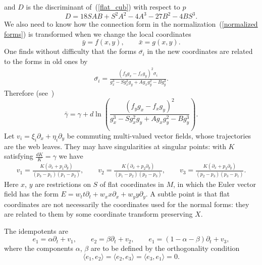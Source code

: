 \documentclass[pdftex]{sigma}
\begin{document}
and $D$ is the discriminant of~(\ref{flat_cub}) with respect to $p$
\[
D=18SAB+S^2A^2-4A^3-27B^2-4BS^3.
\]
We also need to know how the connection form in the normalization~(\ref{normalized forms})
is transformed when we change the local coordinates
\[
\bar{y}=f(x,y), \qquad \bar{x}=g(x,y).
\]
One f\/inds without dif\/f\/iculty that the forms $\bar{\sigma_i}$
in the new coordinates are related to the forms in old ones by
\begin{gather*}%
\bar{\sigma_i}=\frac{(f_yg_x-f_xg_y)^2\sigma_i}{g_x^3-Sg_x^2g_y+Ag_xg_y^2-Bg_y^3}.
\end{gather*}
Therefore (see~\cite{Be})
\begin{equation}\label{connection transforms}
\bar{\gamma}=\gamma+d\ln\left(\frac{(f_yg_x-f_xg_y)^2}{g_x^3-Sg_x^2g_y+Ag_xg_y^2-Bg_y^3}\right).
\end{equation}
Let $v_i=\xi_i \partial_x+\eta_i\partial_y$ be commuting multi-valued vector f\/ields,
whose trajectories are the web leaves. They may have singularities at singular points:
with $K$ satisfying $\frac{dK}{K}=\gamma $ we have
\begin{gather*}%
v_1=\frac{K(\partial_x +p_1 \partial_y)}{(p_3-p_1)(p_1-p_2)},\qquad
v_2=\frac{K(\partial_x +p_2 \partial_y)}{(p_1-p_2)(p_2-p_3)},\qquad
v_3=\frac{K(\partial_x +p_3 \partial_y)}{(p_2-p_3)(p_3-p_1)}.
\end{gather*}
Here $x$, $y$ are restrictions on $S$ of f\/lat coordinates in $M$, in which the Euler vector f\/ield has the form $E=w_tt\partial_t+w_xx\partial_x+w_yy\partial_y$. A subtle point is that f\/lat coordinates are not necessarily the coordinates used for the normal forms: they are related to them by some coordinate transform preserving $X$.

The idempotents are
\begin{equation}\label{idempotents}
e_1=\alpha \partial_t+v_1, \qquad e_2=\beta \partial_t+v_2,\qquad e_1=(1-\alpha -\beta) \partial_t+v_3,
\end{equation}
where the components $\alpha$, $\beta$ are to be def\/ined by the orthogonality condition
\begin{equation}\label{orthogonal}
\langle e_1,e_2\rangle =\langle e_2,e_3\rangle =\langle e_3,e_1\rangle =0.
\end{equation}
\end{document}
